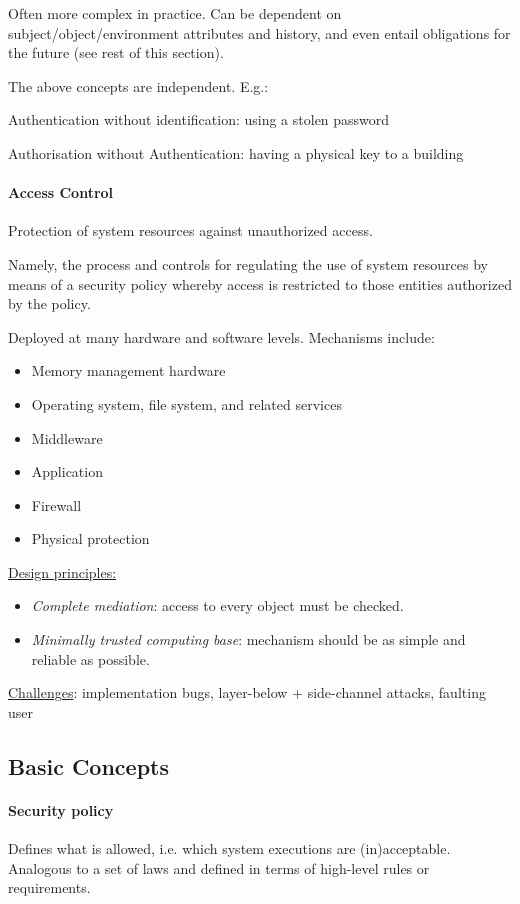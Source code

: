 Often more complex in practice. Can be dependent on subject/object/environment
attributes and history, and even entail obligations for the future (see rest of this section).

\mbox{} %

The above concepts are independent. E.g.:

Authentication without identification: using a stolen password

Authorisation without Authentication: having a physical key to a building

\paragraph{Access Control} Protection of system resources against unauthorized access.

Namely, the process and controls for regulating the use of system resources by means of a security policy whereby access is restricted to those entities authorized by the policy.

Deployed at many hardware and software levels. Mechanisms include:
\begin{itemize}
    \item Memory management hardware
    \item Operating system, file system, and related services
    \item Middleware
    \item Application
    \item Firewall
    \item Physical protection
\end{itemize}

\underline{Design principles:}

\begin{itemize}
    \item \emph{Complete mediation}: access to every object must be checked.
    \item \emph{Minimally trusted computing base}: mechanism should be as simple and reliable as possible.
\end{itemize}

\underline{Challenges}: implementation bugs, layer-below + side-channel attacks, faulting user


\subsection{Basic Concepts}

\paragraph{Security policy} Defines what is allowed, i.e. which system executions are (in)acceptable. Analogous to a set of laws and defined in terms of high-level rules or requirements.

